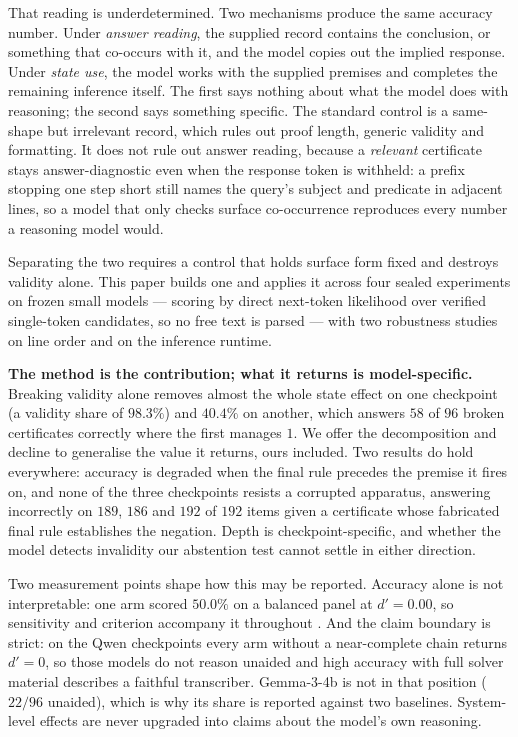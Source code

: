 \documentclass[10pt,twocolumn]{article}
\begin{document}
That reading is underdetermined. Two mechanisms produce the same accuracy
number. Under \emph{answer reading}, the supplied record contains the
conclusion, or something that co-occurs with it, and the model copies out the
implied response. Under \emph{state use}, the model works with the supplied
premises and completes the remaining inference itself. The first says nothing
about what the model does with reasoning; the second says something specific.
The standard control is a same-shape but irrelevant record, which rules out
proof length, generic validity and formatting. It does not rule out answer
reading, because a \emph{relevant} certificate stays answer-diagnostic even when
the response token is withheld: a prefix stopping one step short still names the
query's subject and predicate in adjacent lines, so a model that only checks
surface co-occurrence reproduces every number a reasoning model would.

Separating the two requires a control that holds surface form fixed and destroys
validity alone. This paper builds one and applies it across four sealed experiments on frozen
small models --- scoring by direct next-token likelihood over verified
single-token candidates, so no free text is parsed --- with two robustness studies
on line order and on the inference runtime.

\textbf{The method is the contribution; what it returns is model-specific.}
Breaking validity alone removes almost the whole state effect on one checkpoint
(a validity share of $98.3\%$) and $40.4\%$ on another, which answers $58$ of $96$
broken certificates correctly where the first manages $1$. We offer the
decomposition and decline to generalise the value it returns, ours included.
Two results do hold everywhere: accuracy is degraded when the final rule
precedes the premise it fires on, and none of the three checkpoints resists a
corrupted apparatus, answering incorrectly on $189$, $186$ and $192$ of $192$
items given a certificate whose fabricated final rule establishes the negation.
Depth is checkpoint-specific, and whether the model detects invalidity our
abstention test cannot settle in either direction.

Two measurement points shape how this may be reported. Accuracy alone is not interpretable: one arm scored $50.0\%$ on a balanced panel at $d' = 0.00$, so sensitivity and criterion accompany it throughout
\citep{macmillan1991detection,stanislaw1999calculation}. And the claim boundary
is strict: on the Qwen checkpoints every arm without a near-complete chain
returns $d' = 0$, so those models do not reason unaided and high accuracy with
full solver material describes a faithful transcriber. Gemma-3-4b is not in that
position ($22/96$ unaided), which is why its share is reported against two
baselines. System-level effects are never upgraded into claims about the model's
own reasoning.
\end{document}
